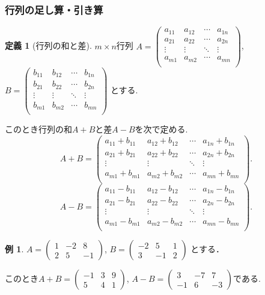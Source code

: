 \documentclass[dvipdfmx,a4paper,11pt]{article} %
\theoremstyle{definition}
\newtheorem{dfn}[thm]{定義}
\newtheorem{exa}[thm]{例}
\begin{document}
 \subsubsection{行列の足し算・引き算}
    \begin{dfn}[行列の和と差]
    \text{}
 
$m \times n$行列
$
A=\begin{pmatrix}
a_{11}& a_{12} & \cdots &a_{1n} \\
a_{21}& a_{22} & \cdots &a_{2n} \\
\vdots& \vdots	&	\ddots   &	\vdots \\
a_{m1}& a_{m2} & \cdots &a_{mn} \\
\end{pmatrix}
$, 
$
B=\begin{pmatrix}
b_{11}& b_{12} & \cdots &b_{1n} \\
b_{21}& b_{22} & \cdots &b_{2n} \\
\vdots& \vdots	&	\ddots   &	\vdots \\
b_{m1}& b_{m2} & \cdots &b_{mn} \\
\end{pmatrix}
$
とする.

このとき行列の和$A+B$と差$A-B$を次で定める.
$$
A+B=
\begin{pmatrix}
a_{11}+b_{11}& a_{12}+b_{12}& \cdots &a_{1n} +b_{1n}\\
a_{21}+b_{21}& a_{22}+b_{22}& \cdots &a_{2n}+b_{2n} \\
\vdots& \vdots	&	\ddots   &	\vdots \\
a_{m1}+b_{m1}& a_{m2} +b_{m2}& \cdots &a_{mn} +b_{mn}\\
\end{pmatrix}.
$$
$$
A-B=
\begin{pmatrix}
a_{11}-b_{11}& a_{12}-b_{12}& \cdots &a_{1n} -b_{1n}\\
a_{21}-b_{21}& a_{22}-b_{22}& \cdots &a_{2n}-b_{2n} \\
\vdots& \vdots	&	\ddots   &	\vdots \\
a_{m1}-b_{m1}& a_{m2}-b_{m2}& \cdots &a_{mn}-b_{mn}\\
\end{pmatrix}.
$$
  \end{dfn}

 \begin{exa}
 $A = 
 \begin{pmatrix}
 1 &-2&8 \\
 2&5&-1
 \end{pmatrix}
 $, 
 $
 B = 
 \begin{pmatrix}
 -2&5&1 \\
 3&-1&2
 \end{pmatrix}
 $
 とする．
 
 このとき$
 A+B =
 \begin{pmatrix}
 -1 &3&9 \\
 5&4&1
 \end{pmatrix}
 $, 
 $
  A-B =
 \begin{pmatrix}
 3 &-7&7 \\
 -1&6&-3
 \end{pmatrix}
 $である.
 \end{exa}
\end{document}
